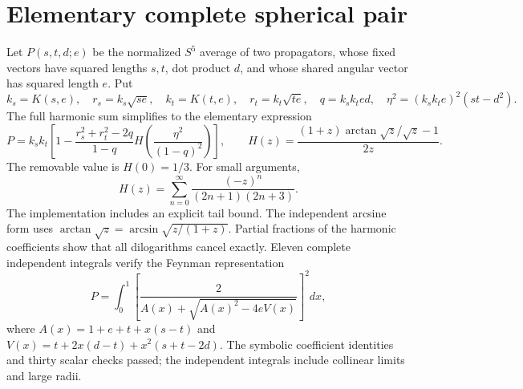 \documentclass[11pt]{article}
\begin{document}
\section*{Elementary complete spherical pair}
Let $P(s,t,d;e)$ be the normalized $S^5$ average of two propagators,
whose fixed vectors have squared lengths $s,t$, dot product $d$, and
whose shared angular vector has squared length $e$. Put
\[
 k_s=K(s,e),\quad r_s=k_s\sqrt{se},\quad
 k_t=K(t,e),\quad r_t=k_t\sqrt{te},\quad
 q=k_sk_t e d,\quad
 \eta^2=(k_sk_t e)^2(st-d^2).
\]
The full harmonic sum simplifies to the elementary expression
\[
 P=k_sk_t\left[1-\frac{r_s^2+r_t^2-2q}{1-q}
 H\!\left(\frac{\eta^2}{(1-q)^2}\right)\right],\qquad
 H(z)=\frac{(1+z)\arctan\sqrt z/\sqrt z-1}{2z}.
\]
The removable value is $H(0)=1/3$. For small arguments,
\[
 H(z)=\sum_{n=0}^{\infty}\frac{(-z)^n}{(2n+1)(2n+3)}.
\]
The implementation includes an explicit tail bound. The independent
arcsine form uses $\arctan\sqrt z=\arcsin\sqrt{z/(1+z)}$.
Partial fractions of the harmonic coefficients show that all
dilogarithms cancel exactly. Eleven complete independent integrals
verify the Feynman representation
\[
 P=\int_0^1\left[
 \frac{2}{A(x)+\sqrt{A(x)^2-4e V(x)}}\right]^2dx,
\]
where $A(x)=1+e+t+x(s-t)$ and
$V(x)=t+2x(d-t)+x^2(s+t-2d)$.
The symbolic coefficient identities and thirty scalar checks passed;
the independent integrals include collinear limits and large radii.
\end{document}
